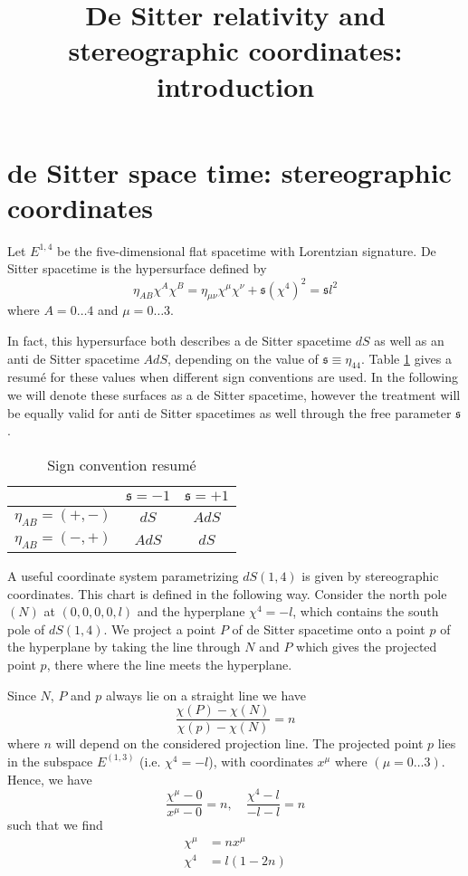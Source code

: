 \documentclass[10pt]{article}
\title{De Sitter relativity and stereographic coordinates: 
	introduction}
\author{}
\date{}
\newcommand{\sfr}{\mathfrak{s}}
\begin{document}
\maketitle

\section{de Sitter space time: stereographic coordinates}

Let $E^{1,4}$ be the five-dimensional flat spacetime with 
Lorentzian signature.
De Sitter spacetime is the hypersurface defined by
\begin{equation}\label{eq:dS_embedded}
	\eta_{AB}\chi^A\chi^B = \eta_{\mu\nu}\chi^{\mu}\chi^{\nu} + 
	\sfr (\chi^4)^2 = \sfr l^2
\end{equation}
where $A=0\ldots4$ and $\mu=0\ldots3$.

In fact, this hypersurface both describes a de Sitter spacetime 
$dS$ as well as an anti de Sitter spacetime $AdS$, depending on 
the value of $\sfr \equiv \eta_{44}$. Table \ref{tab:signConv} 
gives a resum\'e for these values when different sign conventions 
are used. In the following we will denote these surfaces as a de 
Sitter spacetime, however the treatment will be equally valid for 
anti de Sitter spacetimes as well through the free parameter 
$\sfr$.
%
\begin{table}[h]
	\centering
	\begin{tabular}{c|c c}
	& $\sfr = -1$ & $\sfr = +1$ \\
	\hline
	$\eta_{AB} = (+,-)$ & $dS$ & $AdS$ \\
	$\eta_{AB} = (-,+)$ & $AdS$ & $dS$
	\end{tabular}
	\caption{Sign convention resum\'e}
	\label{tab:signConv}
\end{table}
  
A useful coordinate system parametrizing $dS(1,4)$ is given by
stereographic coordinates. This chart is defined in the following 
way. Consider
the north pole $(N)$ at $(0,0,0,0,l)$ and the hyperplane $\chi^4 
= -l$, which
contains the south pole of $dS(1,4)$. We project a point $P$ of 
de Sitter
spacetime onto a point $p$ of the hyperplane by taking the line 
through $N$ and
$P$ which gives the projected point $p$, there where the line 
meets the
hyperplane.

Since $N$, $P$ and $p$ always lie on a straight line we have
\begin{displaymath}
\frac{\chi(P)-\chi(N)}{\chi(p)-\chi(N)} = n
\end{displaymath}
where $n$ will depend on the considered projection line. The 
projected point $p$
lies in the subspace $E^{(1,3)}$ (i.e. $\chi^4=-l$), with 
coordinates $x^\mu$
where $(\mu=0\ldots 3)$. Hence, we have
\begin{displaymath}
\frac{\chi^\mu-0}{x^\mu-0} = n,\quad \frac{\chi^4-l}{-l-l}=n
\end{displaymath}
such that we find
\begin{align}
\chi^\mu &= n x^\mu \\
\chi^4 &= l(1-2n) \label{eq:chi4_stereo}
\end{align}
\end{document}
